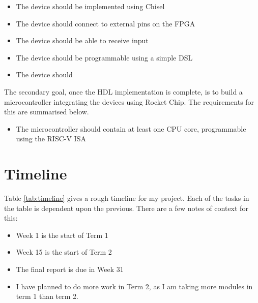 \documentclass[a4paper,fleqn,12pt]{article}
\begin{document}
\begin{itemize}
    \item The device should be implemented using Chisel
    \item The device should connect to external pins on the FPGA
    \item The device should be able to receive input
    \item The device should be programmable using a simple DSL
    \item The device should
\end{itemize}


The secondary goal, once the HDL implementation is complete, is to build a microcontroller integrating the devices using Rocket Chip. The requirements for this are summarised below.

\begin{itemize}
    \item The microcontroller should contain at least one CPU core, programmable using the RISC-V ISA
\end{itemize}

\section{Timeline}

Table \ref{tab:timeline} gives a rough timeline for my project. Each of the tasks in the table is dependent upon the previous. There are a few notes of context for this:

\begin{itemize}
    \item Week 1 is the start of Term 1
    \item Week 15 is the start of Term 2
    \item The final report is due in Week 31
    \item I have planned to do more work in Term 2, as I am taking more modules in term 1 than term 2.
\end{itemize}
\end{document}
